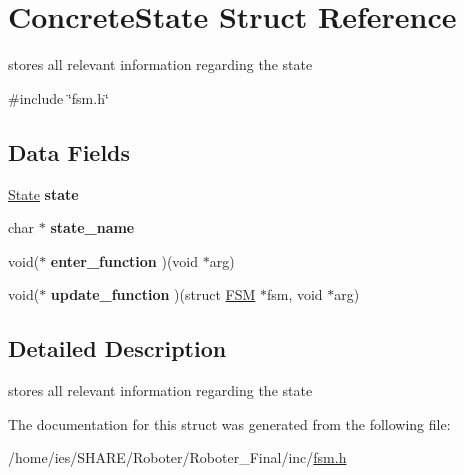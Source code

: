 \hypertarget{structConcreteState}{}\section{Concrete\+State Struct Reference}
\label{structConcreteState}


stores all relevant information regarding the state  




{\ttfamily \#include \char`\"{}fsm.\+h\char`\"{}}

\subsection*{Data Fields}
\begin{DoxyCompactItemize}
\item 
\mbox{\label{structConcreteState_a5de94c9966ffc8c81cb7a488c9e0a5a7}} 
\hyperlink{fsm_8h_a5d74787dedbc4e11c1ab15bf487e61f8}{State} {\bfseries state}
\item 
\mbox{\label{structConcreteState_afff321e10193d86052f43642e382f862}} 
char $\ast$ {\bfseries state\+\_\+name}
\item 
\mbox{\label{structConcreteState_a07b8e3810ddd1edc324456d71a8a9776}} 
void($\ast$ {\bfseries enter\+\_\+function} )(void $\ast$arg)
\item 
\mbox{\label{structConcreteState_ac22a2c7bb7df1948c46404fe166c96cd}} 
void($\ast$ {\bfseries update\+\_\+function} )(struct \hyperlink{structFSM}{F\+SM} $\ast$fsm, void $\ast$arg)
\end{DoxyCompactItemize}


\subsection{Detailed Description}
stores all relevant information regarding the state 

The documentation for this struct was generated from the following file\+:\begin{DoxyCompactItemize}
\item 
/home/ies/\+S\+H\+A\+R\+E/\+Roboter/\+Roboter\+\_\+\+Final/inc/\hyperlink{fsm_8h}{fsm.\+h}\end{DoxyCompactItemize}
